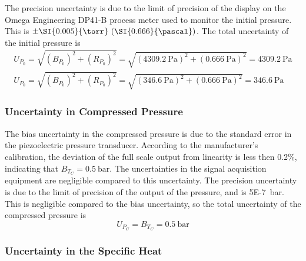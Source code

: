 \documentclass[../main.tex]{subfiles}
\begin{document}
The precision uncertainty is due to the limit of precision of the display
on the Omega Engineering DP41-B process meter used to monitor the initial
pressure. This is $\pm\SI{0.005}{\torr} \ (\SI{0.666}{\pascal})$. The total
uncertainty of the initial pressure is
%
\begin{subequations}
\begin{align}
U_{P_0} = \sqrt{\left(B_{P_0}\right)^2 + \left(R_{P_0}\right)^2} = \sqrt{\left(\SI{4309.2}{\pascal}\right)^2 + \left(\SI{0.666}{\pascal}\right)^2} = \SI{4309.2}{\pascal} \\
U_{P_0} = \sqrt{\left(B_{P_0}\right)^2 + \left(R_{P_0}\right)^2} = \sqrt{\left(\SI{346.6}{\pascal}\right)^2 + \left(\SI{0.666}{\pascal}\right)^2} = \SI{346.6}{\pascal}
\end{align}
\end{subequations}

\subsubsection{Uncertainty in Compressed Pressure}

The bias uncertainty in the compressed pressure is due to the standard
error in the piezoelectric pressure transducer. According to the
manufacturer's calibration, the deviation of the full scale output from
linearity is less then 0.2\%, indicating that $B_{T_C}=\SI{0.5}{\bar}$.
The uncertainties in the signal acquisition equipment are negligible
compared to this uncertainty. The precision uncertainty is due to the limit
of precision of the output of the pressure, and is \SI{5E-7}{\bar}. This
is negligible compared to the bias uncertainty, so the total uncertainty
of the compressed pressure is
%
\begin{equation}
U_{P_C} = B_{T_C} = \SI{0.5}{\bar}
\end{equation}

\subsubsection{Uncertainty in the Specific Heat}
\label{sec:unc-cp}
\end{document}
